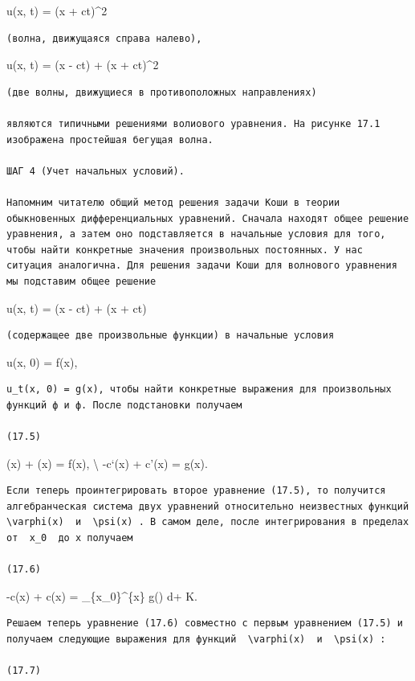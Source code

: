 \documentclass[
  ukrainian,
]{article}
\begin{document}
u(x, t) = (x + ct)\^{}2

\begin{verbatim}
(волна, движущаяся справа налево),
\end{verbatim}

u(x, t) = \sin(x - ct) + (x + ct)\^{}2

\begin{verbatim}
(две волны, движущиеся в противоположных направлениях)

являются типичными решениями волиового уравнения. На рисунке 17.1 изображена простейшая бегущая волна.

ШАГ 4 (Учет начальных условий).

Напомним читателю общий метод решения задачи Коши в теории обыкновенных дифференциальных уравнений. Сначала находят общее решение уравнения, а затем оно подставляется в начальные условия для того, чтобы найти конкретные значения произвольных постоянных. У нас ситуация аналогична. Для решения задачи Коши для волнового уравнения мы подставим общее решение
\end{verbatim}

u(x, t) = \varphi(x - ct) + \psi(x + ct)

\begin{verbatim}
(содержащее две произвольные функции) в начальные условия
\end{verbatim}

u(x, 0) = f(x),

\begin{verbatim}
u_t(x, 0) = g(x), чтобы найти конкретные выражения для произвольных функций ф и ф. После подстановки получаем

(17.5)
\end{verbatim}

\varphi(x) + \psi(x) = f(x), \textbackslash{} -c\varphi`(x) + c\psi'(x)
= g(x).

\begin{verbatim}
Если теперь проинтегрировать второе уравнение (17.5), то получится алгебранческая система двух уравнений относительно неизвестных функций  \varphi(x)  и  \psi(x) . В самом деле, после интегрирования в пределах от  x_0  до x получаем

(17.6)
\end{verbatim}

-c\varphi(x) + c\psi(x) = \int\_\{x\_0\}\^{}\{x\} g(\xi) d\xi + K.

\begin{verbatim}
Решаем теперь уравнение (17.6) совместно с первым уравнением (17.5) и получаем следующие выражения для функций  \varphi(x)  и  \psi(x) :

(17.7)
\end{verbatim}
\end{document}
